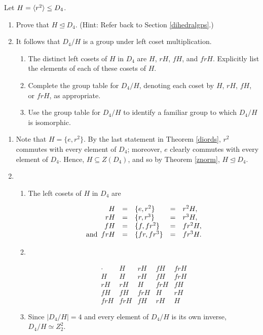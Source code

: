 \begin{exercise} Let $H=\langle r^2\rangle\leq D_4$.
\begin{enumerate}
\item Prove that $H\unlhd D_4$. (Hint: Refer back to Section \ref{dihedralgps}.)
\item It follows that $D_4/H$ is a group under left coset multiplication.
\begin{enumerate}
\item  The distinct left cosets of $H$ in $D_4$ are $H$, $rH$, $fH$, and $frH$. Explicitly list the elements of each of these cosets of $H$.
\item Complete the group table for $D_4/H$, denoting each coset by $H$, $rH$, $fH$, or $frH$, as appropriate.
\item Use the group table for $D_4/H$ to identify a familiar group to which $D_4/H$ is isomorphic.
\end{enumerate}
\end{enumerate}

\end{exercise}


\begin{solution}[print=true]

\begin{enumerate}
\item Note that $H=\{e,r^2\}$. By the last statement in Theorem \ref{diords}, $r^2$ commutes with every element of $D_4$; moreover, $e$ clearly commutes with every element of $D_4$. Hence, $H\subseteq Z(D_4)$, and so by Theorem \ref{znorm}, $H\unlhd D_4$.

\item \begin{enumerate}
\item The left cosets of $H$ in $D_4$ are


$$\begin{array}{rclcl}
H&=&\{e,r^2\}&=&r^2H,\\
rH&=&\{r,r^3\}&=&r^3H,\\
fH&=&\{f, fr^2\}&=&fr^2H,\\
\mbox{and \,}frH&=&\{fr,fr^3\}&=&fr^3H.
\end{array}$$

\item  \

\renewcommand{\arraystretch}{1.3}
$$\begin{array}{r||r|r|r|r}
\cdot &H&rH&fH&frH\\ \hline\hline H &H&rH&fH&frH\\ \hline
rH&rH&H&frH&fH\\ \hline fH&fH&frH&H&rH\\ \hline frH&frH&fH&rH&H

\end{array}$$

\item Since $|D_4/H|=4$ and every element of $D_4/H$ is its own inverse, $D_4/H\simeq Z_2^2$.
\end{enumerate}
\end{enumerate}
\end{solution}


